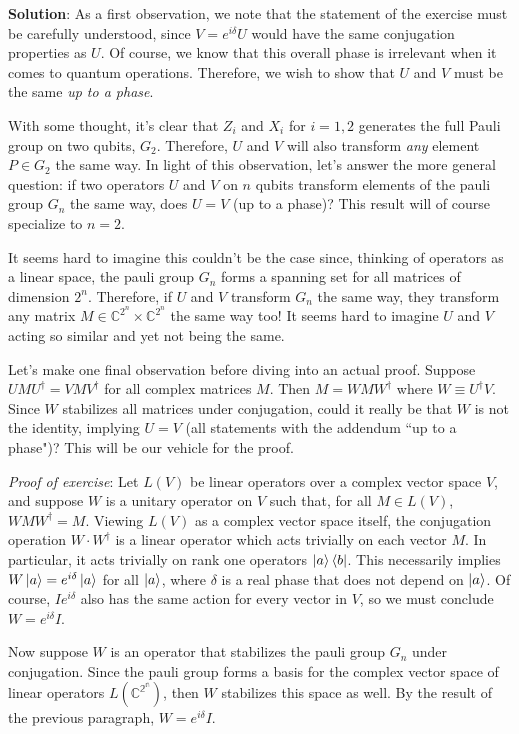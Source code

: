 \documentclass{book}
\begin{document}
    \textbf{Solution}: As a first observation, we note that the statement of the exercise must be carefully understood, since $V = e^{i\delta} U$ would have the same conjugation properties as $U$. Of course, we know that this overall phase is irrelevant when it comes to quantum operations. Therefore, we wish to show that $U$ and $V$ must be the same \emph{up to a phase}.
    
    With some thought, it's clear that $Z_i$ and $X_i$ for $i=1,2$ generates the full Pauli group on two qubits, $G_2$. Therefore, $U$ and $V$ will also transform \emph{any} element $P\in G_2$ the same way. In light of this observation, let's answer the more general question: if two operators $U$ and $V$ on $n$ qubits transform elements of the pauli group $G_n$ the same way, does $U = V$ (up to a phase)? This result will of course specialize to $n=2$.
    
    It seems hard to imagine this couldn't be the case since, thinking of operators as a linear space, the pauli group $G_n$ forms a spanning set for all matrices of dimension $2^n$. Therefore, if $U$ and $V$ transform $G_n$ the same way, they transform any matrix $M \in \mathbb{C}^{2^n} \times \mathbb{C}^{2^n}$ the same way too! It seems hard to imagine $U$ and $V$ acting so similar and yet not being the same.
    
    Let's make one final observation before diving into an actual proof. Suppose $U M U^\dagger = V M V^\dagger$ for all complex matrices $M$. Then $M = W M W^\dagger$ where $W \equiv U^\dagger V$. Since $W$ stabilizes all matrices under conjugation, could it really be that $W$ is not the identity, implying $U = V$ (all statements with the addendum ``up to a phase")? This will be our vehicle for the proof. 
    
    \emph{Proof of exercise}: Let $L(V)$ be linear operators over a complex vector space $V$, and suppose $W$ is a unitary operator on $V$ such that, for all $M \in L(V)$, $W M W^\dagger = M$. Viewing $L(V)$ as a complex vector space itself, the conjugation operation $W \cdot W^\dagger$ is a linear operator which acts trivially on each vector $M$. In particular, it acts trivially on rank one operators $\ket{a}\bra{b}$. This necessarily implies $W \ket{a} = e^{i\delta} \ket{a}$ for all $\ket{a}$, where $\delta$ is a real phase that does not depend on $\ket{a}$. Of course, $I e^{i\delta}$ also has the same action for every vector in $V$, so we must conclude $W = e^{i\delta} I$. 
    
    Now suppose $W$ is an operator that stabilizes the pauli group $G_n$ under conjugation. Since the pauli group forms a basis for the complex vector space of linear operators $L(\mathbb{C^{2^n}})$, then $W$ stabilizes this space as well. By the result of the previous paragraph, $W = e^{i\delta} I$.
    
\end{document}
